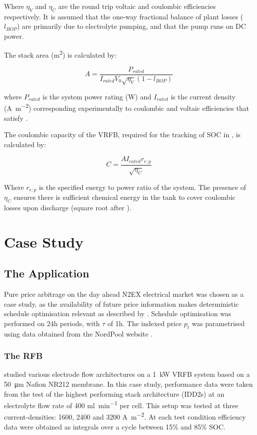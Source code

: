 \documentclass[preprint,3p,review,authoryear,10pt]{elsarticle}
\begin{document}
Where $\eta_V$ and $\eta_C$ are the round trip voltaic and coulombic efficiencies respectively. It is assumed that the one-way fractional balance of plant losses ($l_{BOP}$) are primarily due to electrolyte pumping, and that the pump runs on DC power.

The stack area (\si{\square\meter}) is calculated by:

\begin{equation}
\label{eqn: Simple_RFB_Cost_Model_Stack_Area}
A = \frac{P_{rated}}{I_{rated}V_0\sqrt{\eta_V}(1 - l_{BOP})}
\end{equation}

where $P_{rated}$ is the system power rating (\si{\watt}) and $I_{rated}$ is the current density (\si{\ampere\per\square\metre}) corresponding experimentally to coulombic and voltaic efficiencies that satisfy .

The coulombic capacity of the VRFB, required for the tracking of SOC in , is calculated by:

\begin{equation}
\label{eqn: coulombic_capacity}
C = \frac{AI_{rated}r_{e:p}}{\sqrt{\eta_C}}
\end{equation}

Where $r_{e:p}$ is the specified energy to power ratio of the system. The presence of $\eta_C$ ensures there is sufficient chemical energy in the tank to cover coulombic losses upon discharge (square root after \cite{Darling2014}).


\section{Case Study}
\label{Case Study}

\subsection{The Application}
\label{Results_The_Application}
Pure price arbitrage on the day ahead N2EX electrical market was chosen as a case study, as the availability of future price information makes deterministic schedule optimisation relevant as described by \cite{Hu2010}. Schedule optimisation was performed on 24h periods, with $\tau$ of 1h. The indexed price $p_t$ was parametrised using data obtained from the NordPool website \cite{NordPool2016}.

\subsubsection{The RFB}
\label{Model_Formulation_VRFB_Params}
\cite{Reed2016} studied various electrode flow architectures on a \SI{1}{\kilo\watt} VRFB system based on a \SI{50}{\micro\meter} Nafion NR212 membrane. In this case study, performance data were taken from the test of the highest performing stack architecture (IDD2s) at an electrolyte flow rate of 400 \si{\ml\per\minute} per cell. This setup was tested at three current-densities: 1600, 2400 and 3200 \si{\ampere\per\square\meter}. At each test condition efficiency data were obtained as integrals over a cycle between 15\% and 85\% SOC. 
\end{document}
